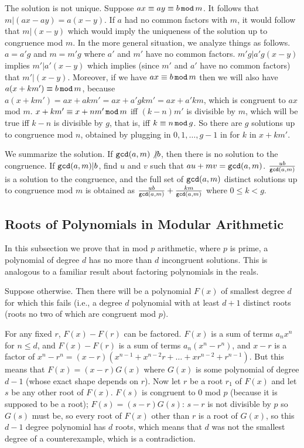 \documentclass[12pt]{article}
\begin{document}
The solution is not unique.  Suppose $ax\equiv ay \equiv b\,{\tt mod}\,m$.   It follows that $m|(ax-ay)=a(x-y)$.
If $a$ had no common factors with $m$, it would follow that $m|(x-y)$ which would imply the uniqueness of the solution
up to congruence mod $m$.  In the more general situation, we analyze things as follows.  $a=a'g$ and $m=m'g$
where $a'$ and $m'$ have no common factors.  $m'g | a'g(x-y)$ implies $m' | a'(x-y)$ which implies (since $m'$ and
$a'$ have no common factors) that $m' | (x-y)$.   Moreover, if we have $ax \equiv b\,{\tt mod}\,m$ then we will also
have $a(x+km')\equiv b\,{\tt mod}\,m$, because $a(x+km')=ax+akm'=ax+a'gkm'=ax+a'km$, which is congruent to
$ax$ mod $m$.   $x+km' \equiv x+nm'\,{\tt mod}\,m$ iff $(k-n)m'$ is divisible by $m$, which will be true iff
$k-n$ is divisible by $g$, that is, iff $k \equiv n \,{\tt mod}\,g$.   So there are $g$ solutions up to congruence
mod $n$, obtained by plugging in $0,1,\ldots,g-1$ in for $k$ in $x+km'$.

We summarize the solution.   If ${\tt gcd}(a,m)\not|b$, then there is no solution to the congruence.
If ${\tt gcd}(a,m)|b$, find $u$ and $v$ such that $au+mv={\tt gcd}(a,m)$.  $\frac{ub}{{\tt gcd}(a,m)}$ is a solution to the congruence, and the full set of ${\tt gcd}(a,m)$ distinct solutions up to congruence mod $m$ is obtained
as $\frac{ub}{{\tt gcd}(a,m)}+\frac{km}{{\tt gcd}(a,m)}$ where $0 \leq k<g$. 

\subsection{Roots of Polynomials in Modular Arithmetic}

In this subsection we prove that in mod $p$ arithmetic, where $p$ is prime, a polynomial of degree $d$ has
no more than $d$ incongruent solutions.   This is analogous to a familiar result about factoring polynomials in the reals.

Suppose otherwise.  Then there will be a polynomial $F(x)$ of smallest degree $d$ for which this fails (i.e., a degree $d$ polynomial with at least $d+1$ distinct roots (roots no two of which are congruent mod $p$).

For any fixed $r$, $F(x)-F(r)$ can be factored.  $F(x)$ is a sum of terms $a_nx^n$ for $n \leq d$,
and $F(x)-F(r)$ is a sum of terms $a_n(x^n-r^n)$, and $x-r$ is a factor of $x^n-r^n = (x-r)(x^{n-1}+x^{n-2}r+\ldots+xr^{n-2}+ r^{n-1})$.  But this means that $F(x)=(x-r)G(x)$ where $G(x)$
is some polynomial of degree $d-1$ (whose exact shape depends on $r$).  Now let $r$ be a root $r_1$ of $F(x)$ and let $s$ be any other root of $F(x)$.  $F(s)$ is congruent to 0 mod $p$ (because it is supposed to be a root);
$F(s) = (s-r)G(s)$:  $s-r$ is not divisible by $p$ so $G(s)$ must be, so every root of $F(x)$ other than $r$
is a root of $G(x)$, so this $d-1$ degree polynomial has $d$ roots, which means that $d$ was not the smallest degree of a counterexample, which is a contradiction.
\end{document}
